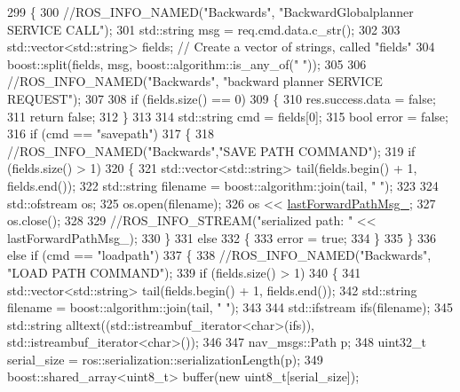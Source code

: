 \begin{DoxyCode}
299 \{
300     \textcolor{comment}{//ROS\_INFO\_NAMED("Backwards", "BackwardGlobalplanner SERVICE CALL");}
301     std::string msg = req.cmd.data.c\_str();
302 
303     std::vector<std::string> fields; \textcolor{comment}{// Create a vector of strings, called "fields"}
304     boost::split(fields, msg, boost::algorithm::is\_any\_of(\textcolor{stringliteral}{" "}));
305 
306     \textcolor{comment}{//ROS\_INFO\_NAMED("Backwards", "backward planner SERVICE REQUEST");}
307 
308     \textcolor{keywordflow}{if} (fields.size() == 0)
309     \{
310         res.success.data = \textcolor{keyword}{false};
311         \textcolor{keywordflow}{return} \textcolor{keyword}{false};
312     \}
313 
314     std::string cmd = fields[0];
315     \textcolor{keywordtype}{bool} error = \textcolor{keyword}{false};
316     \textcolor{keywordflow}{if} (cmd == \textcolor{stringliteral}{"savepath"})
317     \{
318         \textcolor{comment}{//ROS\_INFO\_NAMED("Backwards","SAVE PATH COMMAND");}
319         \textcolor{keywordflow}{if} (fields.size() > 1)
320         \{
321             std::vector<std::string> tail(fields.begin() + 1, fields.end());
322             std::string filename = boost::algorithm::join(tail, \textcolor{stringliteral}{" "});
323 
324             std::ofstream os;
325             os.open(filename);
326             os << \hyperlink{classmove__base__z__client_1_1backward__global__planner_1_1BackwardGlobalPlanner_a058da13b9ee6b1d878830503e67de638}{lastForwardPathMsg\_};
327             os.close();
328 
329             \textcolor{comment}{//ROS\_INFO\_STREAM("serialized path: " << lastForwardPathMsg\_);}
330         \}
331         \textcolor{keywordflow}{else}
332         \{
333             error = \textcolor{keyword}{true};
334         \}
335     \}
336     \textcolor{keywordflow}{else} \textcolor{keywordflow}{if} (cmd == \textcolor{stringliteral}{"loadpath"})
337     \{
338         \textcolor{comment}{//ROS\_INFO\_NAMED("Backwards", "LOAD PATH COMMAND");}
339         \textcolor{keywordflow}{if} (fields.size() > 1)
340         \{
341             std::vector<std::string> tail(fields.begin() + 1, fields.end());
342             std::string filename = boost::algorithm::join(tail, \textcolor{stringliteral}{" "});
343 
344             std::ifstream ifs(filename);
345             std::string alltext((std::istreambuf\_iterator<char>(ifs)), std::istreambuf\_iterator<char>());
346 
347             nav\_msgs::Path p;
348             uint32\_t serial\_size = ros::serialization::serializationLength(p);
349             boost::shared\_array<uint8\_t> buffer(\textcolor{keyword}{new} uint8\_t[serial\_size]);

\end{DoxyCode}
